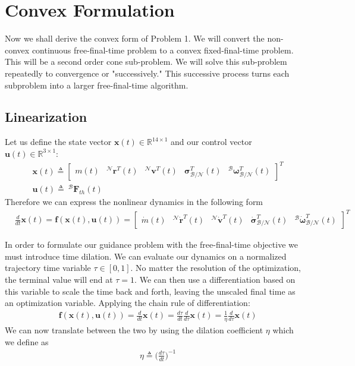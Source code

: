 \chapter{Convex Formulation}
\label{convex}

Now we shall derive the convex form of Problem 1. We will convert the non-convex continuous free-final-time problem to a convex fixed-final-time problem. This will be a second order cone sub-problem. We will solve this sub-problem repeatedly to convergence or "successively." This successive process turns each subproblem into a larger free-final-time algorithm.

\section{Linearization}
Let us define the state vector $\mathbf{x}(t) \in \mathbb{R}^{14\times 1}$ and our control vector $\mathbf{u}(t) \in \mathbb{R}^{3\times 1}$:
\begin{align}
& \mathbf{x}(t) \triangleq 
	\begin{bmatrix}
	m(t) & ^\mathcal{N}\mathbf{r}^T(t) & ^\mathcal{N}\mathbf{v}^T(t) & \boldsymbol{\sigma}_\mathcal{B/N}^T(t) & ^\mathcal{B}\bm{\omega}_\mathcal{B/N}^T(t)   
	\end{bmatrix}^T \\
& \mathbf{u}(t) \triangleq \ ^\mathcal{B}\mathbf{F}_{th}(t)  
\end{align}
Therefore we can express the nonlinear dynamics in the following form
\begin{align}
& \frac{d}{dt}\mathbf{x}(t) = \mathbf{f}(\mathbf{x}(t), \mathbf{u}(t)) =  
	\begin{bmatrix}
	\dot{m}(t) & ^\mathcal{N}\dot{\mathbf{r}}^T(t) & ^\mathcal{N}\dot{\mathbf{v}}^T(t) & \dot{\boldsymbol{\sigma}}_\mathcal{B/N}^T(t) & ^\mathcal{B}\dot{\bm{\omega}}_\mathcal{B/N}^T(t)  
	\end{bmatrix}^T
\end{align}

In order to formulate our guidance problem with the free-final-time objective we must introduce time dilation. We can evaluate our dynamics on a normalized trajectory time variable $\tau \in [0,1]$. No matter the resolution of the optimization, the terminal value will end at $\tau = 1$. We can then use a differentiation based on this variable to scale the time back and forth, leaving the unscaled final time as an optimization variable. Applying the chain rule of differentiation: 
\begin{align}
& \mathbf{f}(\mathbf{x}(t) , \mathbf{u}(t)) =  \frac{d}{dt}\mathbf{x}(t) = \frac{d\tau}{dt} \frac{d}{d\tau}\mathbf{x}(t) =  \frac{1}{\eta}\frac{d}{d\tau}\mathbf{x}(t)
\end{align}
We can now translate between the two by using the dilation coefficient $\eta$ which we define as
\begin{align}
& \eta \triangleq \Big(\frac{d\tau}{dt}\Big)^{-1}
\end{align}

